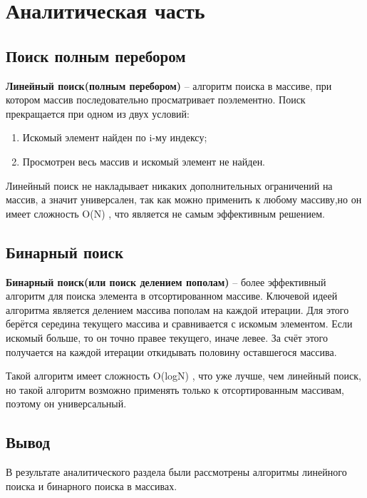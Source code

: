 \chapter{Аналитическая часть}
\section{Поиск полным перебором}
\textbf{Линейный поиск(полным перебором)} – алгоритм поиска в массиве, при котором массив последовательно просматривает поэлементно. Поиск прекращается при одном из двух условий:

\begin{enumerate}
	\item Искомый элемент найден по i-му индексу;
	\item Просмотрен весь массив и искомый элемент не найден.
\end{enumerate}

Линейный поиск не накладывает никаких дополнительных ограничений на массив, а значит универсален, так как можно применить к любому массиву,но он имеет сложность O(N) \cite{virt}, что является не самым эффективным решением.

\section{Бинарный поиск}
\textbf{Бинарный поиск(или поиск делением пополам)} – более эффективный алгоритм для поиска элемента в отсортированном массиве. Ключевой идеей алгоритма является делением массива пополам на каждой итерации. Для этого берётся середина текущего массива и сравнивается с искомым элементом. Если искомый больше, то он точно правее текущего, иначе левее. За счёт этого получается на каждой итерации откидывать половину оставшегося массива.

Такой алгоритм имеет сложность O(logN) \cite{virt}, что уже лучше, чем линейный поиск, но такой алгоритм возможно применять только к отсортированным массивам, поэтому он универсальный.


\section*{Вывод}
В результате аналитического раздела были рассмотрены алгоритмы линейного поиска и бинарного поиска в массивах.

\clearpage
